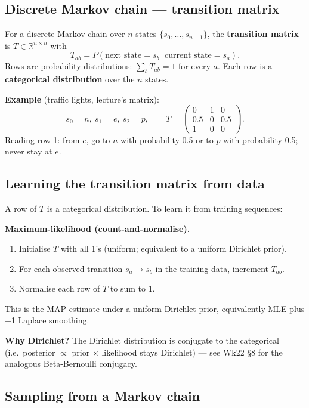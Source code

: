 \documentclass[11pt, a4paper]{article}
\begin{document}
\subsection{Discrete Markov chain --- transition matrix}

\begin{defbox}
For a discrete Markov chain over $n$ states $\{s_0, \ldots, s_{n-1}\}$, the \textbf{transition matrix} is $T \in \mathbb{R}^{n\times n}$ with
\[
T_{ab} = P(\text{next state} = s_b \,|\, \text{current state} = s_a).
\]
Rows are probability distributions: $\sum_b T_{ab} = 1$ for every $a$. Each row is a \textbf{categorical distribution} over the $n$ states.
\end{defbox}

\textbf{Example} (traffic lights, lecture's matrix):
\[
s_0 = n,\ s_1 = e,\ s_2 = p, \qquad
T = \begin{pmatrix} 0 & 1 & 0 \\ 0.5 & 0 & 0.5 \\ 1 & 0 & 0 \end{pmatrix}.
\]
Reading row 1: from $e$, go to $n$ with probability 0.5 or to $p$ with probability 0.5; never stay at $e$.

\subsection{Learning the transition matrix from data}

A row of $T$ is a categorical distribution. To learn it from training sequences:

\textbf{Maximum-likelihood (count-and-normalise).}
\begin{enumerate}
  \item Initialise $T$ with all 1's (uniform; equivalent to a uniform Dirichlet prior).
  \item For each observed transition $s_a \to s_b$ in the training data, increment $T_{ab}$.
  \item Normalise each row of $T$ to sum to 1.
\end{enumerate}
This is the MAP estimate under a uniform Dirichlet prior, equivalently MLE plus +1 Laplace smoothing.

\textbf{Why Dirichlet?} The Dirichlet distribution is conjugate to the categorical (i.e.\ posterior $\propto$ prior $\times$ likelihood stays Dirichlet) — see Wk22 §8 for the analogous Beta-Bernoulli conjugacy.

\subsection{Sampling from a Markov chain}
\end{document}
